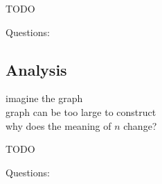 \documentclass[a4]{scrartcl}
\begin{document}
\color{red} TODO
\color{black}

\color{violet} Questions:
\color{black}



\subsection*{Analysis}
imagine the graph \\
graph can be too large to construct \\
why does the meaning of $n$ change?



\color{red} TODO
\color{black}

\color{violet} Questions:
\color{black}















\newpage

\printbibliography
\end{document}
